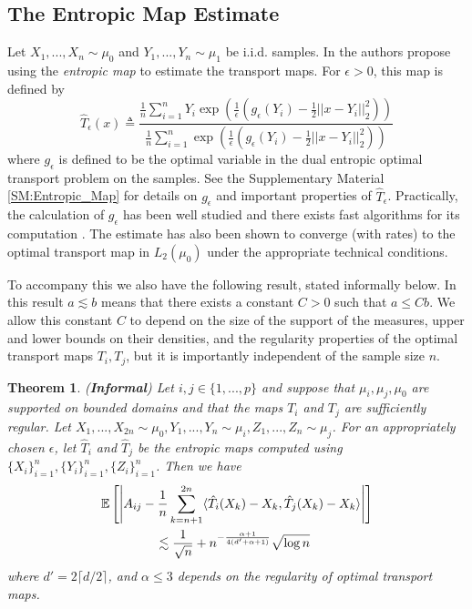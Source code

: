 \documentclass[nohyperref]{article}
\newtheorem{theorem}{Theorem}
\theoremstyle{definition}
\begin{document}
\subsection{The Entropic Map Estimate}

Let $X_1,...,X_n \sim \mu_0$ and $Y_1,...,Y_n \sim \mu_1$ be i.i.d. samples. In \cite{pooladian2021entropic} the authors propose using the \textit{entropic map} to estimate the transport maps. For $\epsilon > 0$, this map is defined by 
\begin{equation} \label{eq:entropic_map}
    \hat{T}_\epsilon(x) \triangleq \frac{\frac{1}{n}\displaystyle\sum_{i=1}^n Y_i \exp\left (\frac{1}{\epsilon} (g_{\epsilon}(Y_i) - \frac{1}{2}||x - Y_i||_2^2) \right )}{\frac{1}{n}\displaystyle\sum_{i=1}^n \exp\left (\frac{1}{\epsilon} (g_{\epsilon}(Y_i) - \frac{1}{2}||x - Y_i||_2^2) \right )}
\end{equation}
where $g_\epsilon$ is defined to be the optimal variable in the dual entropic optimal transport  problem on the samples. See the Supplementary Material \ref{SM:Entropic_Map} for details on  $g_\epsilon$ and important properties of $\hat{T}_\epsilon$. Practically, the calculation of $g_\epsilon$ has been well studied and there exists fast algorithms for its computation \cite{peyre2020computational}. The estimate has also been shown to converge (with rates) to the optimal transport map in $L_2(\mu_0)$ under the appropriate technical conditions. 

To accompany this we also have the following result, stated informally below. In this result $a \lesssim b$ means that there exists a constant $C > 0$ such that $a \leq Cb$. We allow this constant $C$ to depend on the size of the support of the measures, upper and lower bounds on their densities, and the regularity properties of the optimal transport maps $T_i,T_j$, but it is importantly independent of the sample size $n$.
\begin{theorem}(\textbf{Informal}) \label{thm:convergence}
Let $i,j \in \{1,...,p\}$ and suppose that $\mu_i,\mu_j,\mu_0$ are supported on bounded domains and that the maps $T_i$ and $T_j$ are sufficiently regular. Let $X_1,...,X_{2n} \sim \mu_0, Y_1,...,Y_n \sim \mu_i, Z_1,...,Z_n \sim \mu_j$. For an appropriately chosen $\epsilon$, let $\hat{T}_i$ and $\hat{T}_j$ be the entropic maps computed using $\{X_{i}\}_{i=1}^{n}, \{Y_{i}\}_{i=1}^{n}, \{Z_{i}\}_{i=1}^{n}$. Then we have 
    \begin{equation}
    \begin{split}
        & \mathbb{E}\left [ \left | A_{ij} - \frac{1}{n} \sum_{k=n+1}^{2n} \langle \hat{T}_i(X_k) - X_k, \hat{T}_j(X_k) - X_k \rangle \right | \right ] \\
        &\hspace{1.5cm} \lesssim \frac{1}{\sqrt{n}} + n^{-\frac{\alpha + 1}{4(d' + \alpha + 1)}}\sqrt{\log n}
    \end{split}
    \end{equation}
    where  $d' = 2\lceil d/2 \rceil$, and $\alpha \leq 3$ depends on the regularity of optimal transport maps.
\end{theorem}
\end{document}

